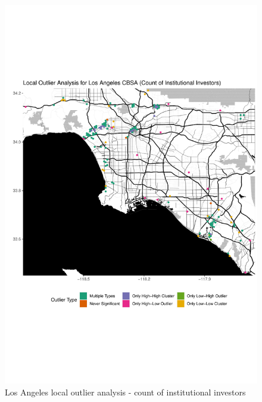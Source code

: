 \begin{figure}
	\centering
	\includegraphics[width=1\linewidth]{Figures/ChapterIV/LA_Count_LO}
	\caption[Los Angeles CBSA Local Outlier Analysis - Count of Institutional Investors 1999-2018]{Los Angeles local outlier analysis - count of institutional investors}
	\label{fig:LAcountlocaloutliercount}
\end{figure}	

